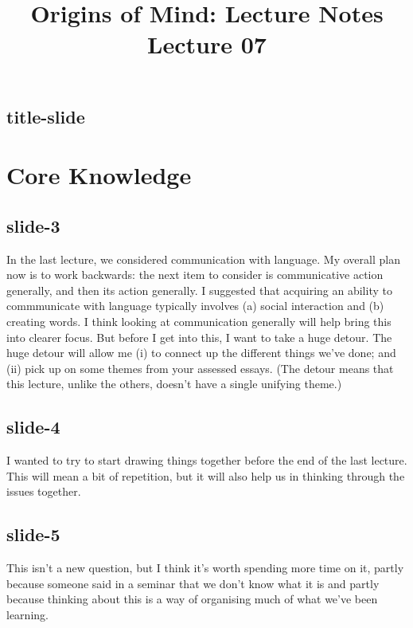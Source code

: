 \documentclass[12pt,\papersize]{extarticle}
\begin{document}
\setlength\footnotesep{1em}









\title {Origins of Mind: Lecture Notes \\ Lecture 07}
 
\maketitle
 
 
\subsection{title-slide}
 
\section{Core Knowledge}
 
 
\subsection{slide-3}
In the last lecture, we considered communication with language.
My overall plan now is to work backwards: the next item to consider is communicative action generally, and then its action generally.
I suggested that acquiring an ability to commmunicate with language typically involves (a) social interaction and (b) creating words.
I think looking at communication generally will help bring this into clearer focus.
But before I get into this, I want to take a huge detour.
The huge detour will allow me (i) to connect up the different things we've done; and (ii) pick up on some themes from your assessed essays.
(The detour means that this lecture, unlike the others, doesn't have a single unifying theme.)
 
 
\subsection{slide-4}
I wanted to try to start drawing things together before the end of the last lecture.
This will mean a bit of repetition, but it will also help us in thinking through the issues together.
 
 
\subsection{slide-5}
This isn't a new question, but I think it's worth spending more time on it, partly because someone said in a seminar that we don't know what it is and partly because thinking about this is a way of organising much of what we've been learning.
 
\end{document}
